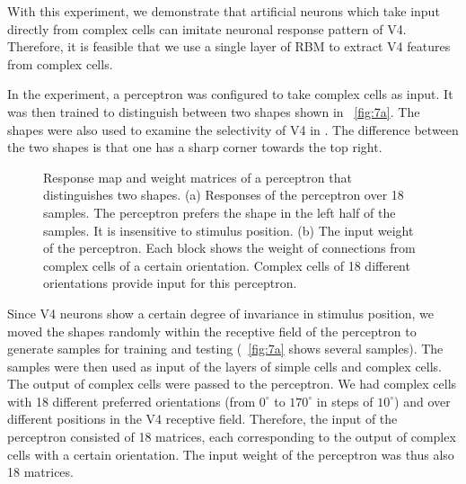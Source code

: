 \documentclass[twocolumn]{article}
\begin{document}
With this experiment, we demonstrate that artificial neurons which take input directly from complex cells can imitate neuronal response pattern of V4.
Therefore, it is feasible that we use a single layer of RBM to extract V4 features from complex cells.

In the experiment, a perceptron was configured to take complex cells as input.
It was then trained to distinguish between two shapes shown in \figurename~\ref{fig:7a}.
The shapes were also used to examine the selectivity of V4 in \cite{pasupathy2001}.
The difference between the two shapes is that one has a sharp corner towards the top right.

\begin{figure}
\centering
{}\hfil
{}
\caption{Response map and weight matrices of a perceptron that distinguishes two shapes.
(a) Responses of the perceptron over 18 samples.
The perceptron prefers the shape in the left half of the samples.
It is insensitive to stimulus position.
(b) The input weight of the perceptron. 
Each block shows the weight of connections from complex cells of a certain orientation.
Complex cells of 18 different orientations provide input for this perceptron.}
\label{fig:7}
\end{figure}

Since V4 neurons show a certain degree of invariance in stimulus position,
we moved the shapes randomly within the receptive field of the perceptron 
to generate samples for training and testing (\figurename~\ref{fig:7a} shows several samples).
The samples were then used as input of the layers of simple cells and complex cells.
The output of complex cells were passed to the perceptron.
We had complex cells with 18 different preferred orientations (from $0^\circ$ to $170^\circ$ in steps of $10^\circ$) 
and over different positions in the V4 receptive field.
Therefore, the input of the perceptron consisted of 18 matrices, 
each corresponding to the output of complex cells with a certain orientation.
The input weight of the perceptron was thus also 18 matrices.
\end{document}
